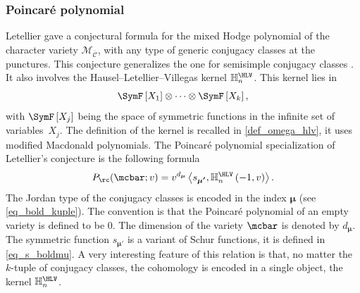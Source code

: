 \subsubsection{Poincaré polynomial}
Letellier \cite{Letellier13} gave a conjectural formula for the mixed Hodge polynomial of the character variety $\mathcal{M}_{\boldsymbol{\overline{\mathcal{C}}}}$, with any type of generic conjugacy classes at the punctures. This conjecture generalizes the one for semisimple conjugacy classes \cite{Hausel_Letellier_Villegas}. It also involves the Hausel--Letellier--Villegas kernel $\mathbb{H}_n^{\HLV}$. This kernel lies in
\[
\SymF\left[X_1\right]\otimes \dots \otimes \SymF\left[X_k\right],
\]
with $\SymF\left[X_j\right]$ being the space of symmetric functions in the infinite set of variables~$X_j$. The definition of the kernel is recalled in \ref{def_omega_hlv}, it uses modified Macdonald polynomials. The Poincaré polynomial specialization of Letellier's conjecture is the following formula
\begin{equation}\label{eq_poincare_intro}
P_{\rc}(\mcbar; v) = v^{d_{\boldsymbol{\mu}}} \left\langle s_{\boldsymbol{\mu'}}, \mathbb{H}_n^{\HLV}\left(-1,v\right)\right\rangle.
\end{equation}
The Jordan type of the conjugacy classes is encoded in the index $\boldsymbol{\mu}$ (see \eqref{eq_bold_kuple}). The convention is that the Poincaré polynomial of an empty variety is defined to be $0$. The dimension of the variety $\mcbar$ is denoted by $d_{\boldsymbol{\mu}}$. The symmetric function $s_{\boldsymbol{\mu'}}$ is a variant of Schur functions, it is defined in \eqref{eq_s_boldmu}. A very interesting feature of this relation is that, no matter the $k$-tuple of conjugacy classes, the cohomology is encoded in a single object, the kernel $\mathbb{H}_n^{\HLV}$.

